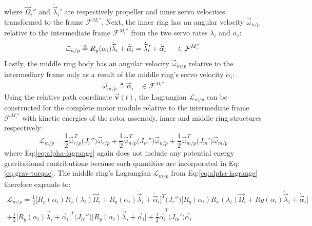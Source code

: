 where $\vec{\Omega}_i''$ and $\dot{\vec{\lambda}}_i'$ are respectively propeller and inner servo velocities transformed to the frame $\mathcal{F}^{M_i''}$. Next, the inner ring has an angular velocity $\vec{\omega}_{n/p}$ relative to the intermediate frame $\mathcal{F}^{M_i''}$ from the two servo rates $\dot{\lambda}_i$ and $\dot{\alpha}_i$:
\begin{equation}\label{eq:inner-relative}
\vec{\omega}_{n/p}\triangleq R_y(\alpha_i)\dot{\vec{\lambda}}_i+\dot{\vec{\alpha}}_i=\dot{\vec{\lambda}}_i\text{}\hspace{-2pt}'+\dot{\vec{\alpha}}_i~~~~\in\mathcal{F}^{M_i''}
\end{equation}
Lastly, the middle ring body has an angular velocity $\vec{\omega}_{m/p}$ relative to the intermediary frame only as a result of the middle ring's servo velocity $\dot{\alpha}_i$:
\begin{equation}\label{eq:middle-relative}
\vec{\omega}_{m/p}\triangleq\dot{\vec{\alpha}}_i~~~~\in\mathcal{F}^{M_i''}
\end{equation}
Using the relative path coordinate $\vec{\mathbf{v}}(t)$, the Lagrangian $\mathcal{L}_{m/p}$ can be constructed for the complete motor module relative to the intermediate frame $\mathcal{F}^{M_i''}$ with kinetic energies of the rotor assembly, inner and middle ring structures respectively:
\begin{equation}\label{eq:alpha-lagrange}
\mathcal{L}_{m/p}=\frac{1}{2}\vec{\omega}_{r/p}^{\hspace{2pt}T}\big(J_{r}''\big)\vec{\omega}_{r/p}+\frac{1}{2}\vec{\omega}_{n/p}^{\hspace{2pt}T}\big(J_{ir}''\big)\vec{\omega}_{n/p}+\frac{1}{2}\vec{\omega}_{m/p}^{\hspace{2pt}T}\big(J_{m}'\big)\vec{\omega}_{m/p}
\end{equation}
where Eq:\ref{eq:alpha-lagrange} again does not include any potential energy gravitational contributions because such quantities are incorporated in Eq:\ref{eq:grav-torque}. The middle ring's Lagrangian $\mathcal{L}_{m/p}$ from Eq:\ref{eq:alpha-lagrange} therefore expands to:
\begin{multline}\label{eq:alpha-lagrange-two}
\mathcal{L}_{m/p}=\frac{1}{2}\Big[R_y(\alpha_i)R_x(\lambda_i)\vec{\Omega}_i+R_y(\alpha_i)\dot{\vec{\lambda}}_i+\dot{\vec{\alpha}}_i\Big]^T\big(J_r''\big)\Big[R_y(\alpha_i)R_x(\lambda_i)\vec{\Omega}_i+Ry(\alpha_i)\dot{\vec{\lambda}}_i+\dot{\vec{\alpha}}_i\Big]\\
+\frac{1}{2}\Big[R_y(\alpha_i)\dot{\vec{\lambda}}_i+\dot{\vec{\alpha}}_i\Big]^T\big(J_{ir}''\big)\Big[R_y(\alpha_i)\dot{\vec{\lambda}}_i+\dot{\vec{\alpha}}_i\Big]
+\frac{1}{2}\dot{\vec{\alpha}}_i^{\hspace{2pt}T}\big(J_m'\big)\dot{\vec{\alpha}}_i
\end{multline}
